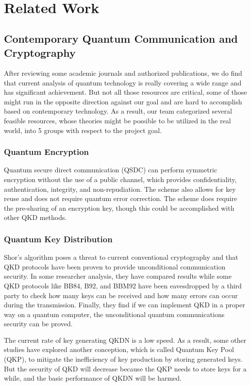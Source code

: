 \documentclass[sigconf]{acmart}
\begin{document}
\section{Related Work}
\subsection{Contemporary Quantum Communication and Cryptography} %
After reviewing some academic journals and authorized publications, we do find that current analysis of quantum technology is really covering a wide range and has significant achievement. But not all those resources are critical, some of those might run in the opposite direction against our goal and are hard to accomplish based on contemporary technology. As a result, our team categorized several feasible resources, whose theories might be possible to be utilized in the real world, into 5 groups with respect to the project goal.

\subsubsection{Quantum Encryption}
Quantum secure direct communication (QSDC) can perform symmetric encryption without the use of a public channel, which provides confidentiality, authentication, integrity, and non-repudiation. The scheme also allows for key reuse and does not require quantum error correction. The scheme does require the pre-sharing of an encryption key, though this could be accomplished with other QKD methods\cite{amerimehr_quantum_2018}.

\subsubsection{Quantum Key Distribution}

Shor’s algorithm poses a threat to current conventional cryptography and that QKD protocols have been proven to provide unconditional communication security. In some researcher analysis, they have compared results while some QKD protocols like BB84, B92, and BBM92 have been eavesdropped by a third party to check how many keys can be received and how many errors can occur during the transmission. Finally, they find if we can implement QKD in a proper way on a quantum computer, the unconditional quantum communications security can be proved\cite{nurhadi_quantum_2018}.

The current rate of key generating QKDN is a low speed. As a result, some other studies have explored another conception, which is called Quantum Key Pool (QKP), to mitigate the inefficiency of key production by storing generated keys. But the security of QKD will decrease because the QKP needs to store keys for a while, and the basic performance of QKDN will be harmed\cite{liu_multi-path_2019}.
\end{document}
